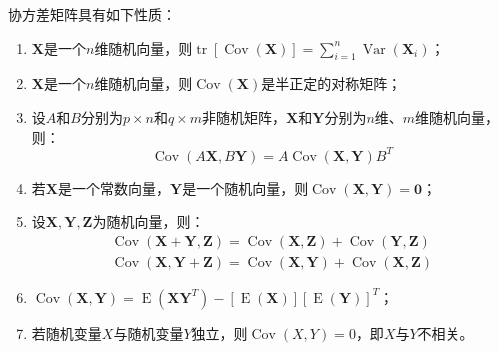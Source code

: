 \begin{property}\label{prop:CovMat}
	协方差矩阵具有如下性质：
	\begin{enumerate}
		\item $\mathbf{X}$是一个$n$维随机向量，则$\operatorname{tr}[\operatorname{Cov}(\mathbf{X})]=\sum\limits_{i=1}^{n}\operatorname{Var}(\mathbf{X}_i)$；
		\item $\mathbf{X}$是一个$n$维随机向量，则$\operatorname{Cov}(\mathbf{X})$是半正定的对称矩阵；
		\item 设$A$和$B$分别为$p\times n$和$q\times m$非随机矩阵，$\mathbf{X}$和$\mathbf{Y}$分别为$n$维、$m$维随机向量，则：
		\begin{equation*}
			\operatorname{Cov}(A\mathbf{X},B\mathbf{Y})=A\operatorname{Cov}(\mathbf{X},\mathbf{Y})B^T
		\end{equation*}
		\item 若$\mathbf{X}$是一个常数向量，$\mathbf{Y}$是一个随机向量，则$\operatorname{Cov}(\mathbf{X},\mathbf{Y})=\mathbf{0}$；
		\item 设$\mathbf{X},\mathbf{Y},\mathbf{Z}$为随机向量，则：
		\begin{gather*}
			\operatorname{Cov}(\mathbf{X}+\mathbf{Y},\mathbf{Z})=\operatorname{Cov}(\mathbf{X},\mathbf{Z})+\operatorname{Cov}(\mathbf{Y},\mathbf{Z}) \\
			\operatorname{Cov}(\mathbf{X},\mathbf{Y}+\mathbf{Z})=\operatorname{Cov}(\mathbf{X},\mathbf{Y})+\operatorname{Cov}(\mathbf{X},\mathbf{Z})
		\end{gather*}
		\item $\operatorname{Cov}(\mathbf{X},\mathbf{Y})=\operatorname{E}(\mathbf{X}\mathbf{Y}^T)-[\operatorname{E}(\mathbf{X})][\operatorname{E}(\mathbf{Y})]^T$；
		\item 若随机变量$X$与随机变量$Y$独立，则$\operatorname{Cov}(X,Y)=0$，即$X$与$Y$不相关。
	\end{enumerate}
\end{property}
